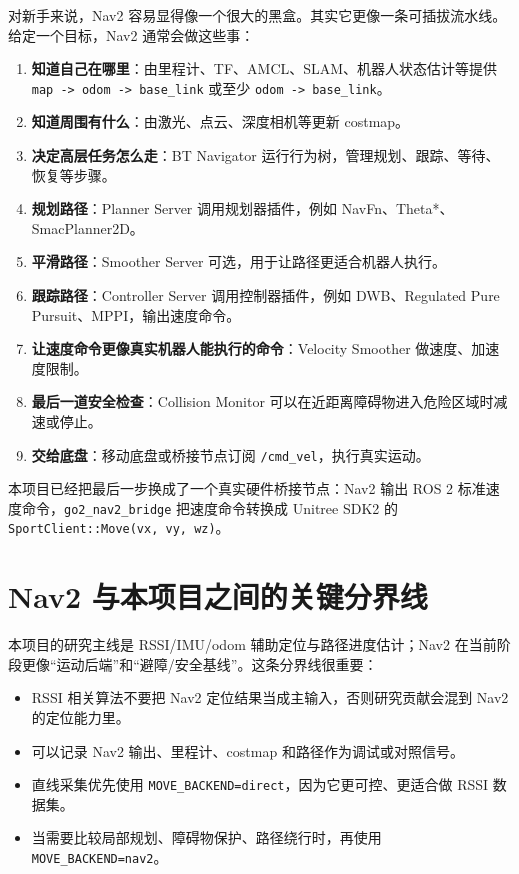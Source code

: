 \documentclass[UTF8,11pt,a4paper,openany]{ctexrep}
\newcommand{\code}[1]{\nolinkurl{#1}}
\newcommand{\topic}[1]{\nolinkurl{#1}}
\newcommand{\pkg}[1]{\nolinkurl{#1}}
\begin{document}
对新手来说，Nav2 容易显得像一个很大的黑盒。其实它更像一条可插拔流水线。给定一个目标，Nav2 通常会做这些事：

\begin{enumerate}
  \item \textbf{知道自己在哪里}：由里程计、TF、AMCL、SLAM、机器人状态估计等提供 \topic{map -> odom -> base_link} 或至少 \topic{odom -> base_link}。
  \item \textbf{知道周围有什么}：由激光、点云、深度相机等更新 costmap。
  \item \textbf{决定高层任务怎么走}：BT Navigator 运行行为树，管理规划、跟踪、等待、恢复等步骤。
  \item \textbf{规划路径}：Planner Server 调用规划器插件，例如 NavFn、Theta*、SmacPlanner2D。
  \item \textbf{平滑路径}：Smoother Server 可选，用于让路径更适合机器人执行。
  \item \textbf{跟踪路径}：Controller Server 调用控制器插件，例如 DWB、Regulated Pure Pursuit、MPPI，输出速度命令。
  \item \textbf{让速度命令更像真实机器人能执行的命令}：Velocity Smoother 做速度、加速度限制。
  \item \textbf{最后一道安全检查}：Collision Monitor 可以在近距离障碍物进入危险区域时减速或停止。
  \item \textbf{交给底盘}：移动底盘或桥接节点订阅 \topic{/cmd_vel}，执行真实运动。
\end{enumerate}

本项目已经把最后一步换成了一个真实硬件桥接节点：Nav2 输出 ROS 2 标准速度命令，\pkg{go2_nav2_bridge} 把速度命令转换成 Unitree SDK2 的 \code{SportClient::Move(vx, vy, wz)}。

\section{Nav2 与本项目之间的关键分界线}

本项目的研究主线是 RSSI/IMU/odom 辅助定位与路径进度估计；Nav2 在当前阶段更像“运动后端”和“避障/安全基线”。这条分界线很重要：

\begin{itemize}
  \item RSSI 相关算法不要把 Nav2 定位结果当成主输入，否则研究贡献会混到 Nav2 的定位能力里。
  \item 可以记录 Nav2 输出、里程计、costmap 和路径作为调试或对照信号。
  \item 直线采集优先使用 \code{MOVE_BACKEND=direct}，因为它更可控、更适合做 RSSI 数据集。
  \item 当需要比较局部规划、障碍物保护、路径绕行时，再使用 \code{MOVE_BACKEND=nav2}。
\end{itemize}
\end{document}
